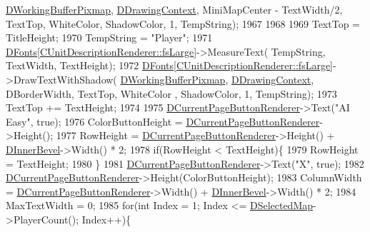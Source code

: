 \begin{DoxyCode}
      \hyperlink{classCApplicationData_afa34cf2780f38dd28c0c811e69d60a97}{DWorkingBufferPixmap}, \hyperlink{classCApplicationData_aa6c5bea9bdcc64398e5a3f693661d37c}{DDrawingContext}, MiniMapCenter - TextWidth/2, 
      TextTop, WhiteColor, ShadowColor, 1, TempString);
1967 
1968     
1969     TextTop = TitleHeight;
1970     TempString = \textcolor{stringliteral}{"Player"};
1971     \hyperlink{classCApplicationData_afde9247d0a3ea87393ec86dcdb1e8274}{DFonts}[\hyperlink{classCUnitDescriptionRenderer_a3ea4cd83b6dd9533ab3abb953a7da35aaf467097fe4f4811a5e2f1959c86e071d}{CUnitDescriptionRenderer::fsLarge}]->MeasureText(
      TempString, TextWidth, TextHeight);
1972     \hyperlink{classCApplicationData_afde9247d0a3ea87393ec86dcdb1e8274}{DFonts}[\hyperlink{classCUnitDescriptionRenderer_a3ea4cd83b6dd9533ab3abb953a7da35aaf467097fe4f4811a5e2f1959c86e071d}{CUnitDescriptionRenderer::fsLarge}]->DrawTextWithShadow(
      \hyperlink{classCApplicationData_afa34cf2780f38dd28c0c811e69d60a97}{DWorkingBufferPixmap}, \hyperlink{classCApplicationData_aa6c5bea9bdcc64398e5a3f693661d37c}{DDrawingContext}, DBorderWidth, TextTop, WhiteColor
      , ShadowColor, 1, TempString);
1973     TextTop += TextHeight;
1974     
1975     \hyperlink{classCApplicationData_abfe1743f2634b069ccc811db4a8733a8}{DCurrentPageButtonRenderer}->Text(\textcolor{stringliteral}{"AI Easy"}, \textcolor{keyword}{true});
1976     ColorButtonHeight = \hyperlink{classCApplicationData_abfe1743f2634b069ccc811db4a8733a8}{DCurrentPageButtonRenderer}->Height();
1977     RowHeight = \hyperlink{classCApplicationData_abfe1743f2634b069ccc811db4a8733a8}{DCurrentPageButtonRenderer}->Height() + 
      \hyperlink{classCApplicationData_a29a687c44dceb9e87a56d96612d59ab5}{DInnerBevel}->Width() * 2;
1978     \textcolor{keywordflow}{if}(RowHeight < TextHeight)\{
1979         RowHeight = TextHeight;
1980     \}
1981     \hyperlink{classCApplicationData_abfe1743f2634b069ccc811db4a8733a8}{DCurrentPageButtonRenderer}->Text(\textcolor{stringliteral}{"X"}, \textcolor{keyword}{true});
1982     \hyperlink{classCApplicationData_abfe1743f2634b069ccc811db4a8733a8}{DCurrentPageButtonRenderer}->Height(ColorButtonHeight);
1983     ColumnWidth = \hyperlink{classCApplicationData_abfe1743f2634b069ccc811db4a8733a8}{DCurrentPageButtonRenderer}->Width() + 
      \hyperlink{classCApplicationData_a29a687c44dceb9e87a56d96612d59ab5}{DInnerBevel}->Width() * 2;
1984     MaxTextWidth = 0;
1985     \textcolor{keywordflow}{for}(\textcolor{keywordtype}{int} Index = 1; Index <= \hyperlink{classCApplicationData_abf74a18394e479b7090a8f9a55608867}{DSelectedMap}->PlayerCount(); Index++)\{

\end{DoxyCode}
